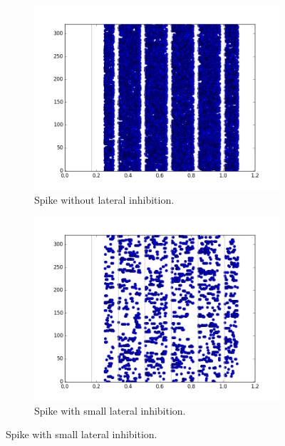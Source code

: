  \begin{figure}[h!]
	\centering
	\begin{subfigure}[t]{.55\textwidth}
  		\centering
  		\includegraphics[width=.9\linewidth]{imgs/app/inhib_no.png}
  		\caption{Spike without lateral inhibition.}
  		\label{fig:sub1}
	\end{subfigure}%
	
	\begin{subfigure}[t]{.55\textwidth}
  		\centering
  		\includegraphics[width=.9\linewidth]{imgs/app/inhib_small.png}
  		\caption{Spike with small lateral inhibition.}
  		\label{fig:sub2}
	\end{subfigure}
	

\end{figure}
